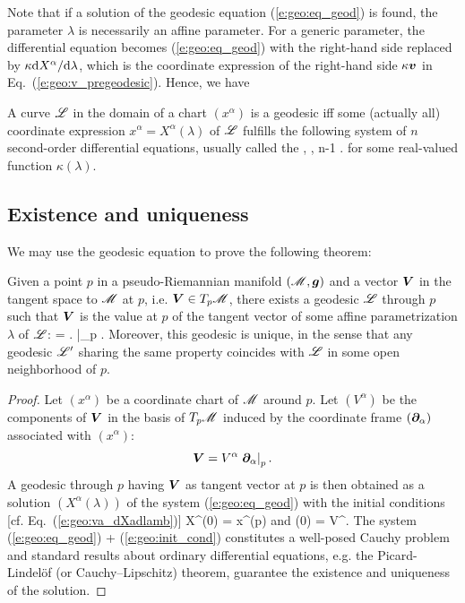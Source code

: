 Note that if a solution of the geodesic equation (\ref{e:geo:eq_geod}) is found, the parameter
$\lambda$ is necessarily an affine parameter.
For a generic parameter,
the differential equation becomes (\ref{e:geo:eq_geod}) with the right-hand side
replaced by $\kappa \mathrm{d} X^\alpha /\mathrm{d}\lambda$, which is the coordinate
expression of the right-hand side $\kappa \bm{v}$ in
Eq.~(\ref{e:geo:v_pregeodesic}). Hence, we have
\begin{prop}
A curve $\mathscr{L}$ in the domain of a chart $(x^\alpha)$ is a geodesic
iff some (actually all) coordinate expression $x^\alpha = X^\alpha(\lambda)$
of $\mathscr{L}$ fulfills the following
system of $n$ second-order differential equations, usually called the
,
\be \label{e:geo:pregeod_eq_comp}
    ,   \leq \alpha \leq n-1 .
\ee
for some real-valued function $\kappa(\lambda)$.
\end{prop}

\subsection{Existence and uniqueness} \label{s:geo:existence_uniqueness}

We may use the geodesic equation to prove the following
theorem:
\begin{prop}
\label{p:geo:exist_uniq_geod}
Given a point $p$ in a pseudo-Riemannian manifold $(\mathscr{M},\bm{g})$ and a vector
$\bm{V}$ in the tangent space to $\mathscr{M}$ at $p$, i.e. $\bm{V} \in T_p\mathscr{M}$,
there exists a geodesic $\mathscr{L}$ through $p$ such that
$\bm{V}$ is the value at $p$ of the tangent vector of some affine parametrization
$\lambda$ of $\mathscr{L}$:
\be
     = \left.  \right|_p .
\ee
Moreover, this geodesic is unique, in the sense that any geodesic $\mathscr{L}'$
sharing the same property coincides with $\mathscr{L}$
in some open neighborhood of $p$.
\end{prop}
\begin{proof}
Let $(x^\alpha)$ be a coordinate chart of $\mathscr{M}$ around $p$. Let $(V^\alpha)$
be the components of $\bm{V}$ in the basis of $T_p\mathscr{M}$ induced by
the coordinate frame $(\bm{\partial}_\alpha)$ associated with $(x^\alpha)$:
\[
    \bm{V} = V^\alpha \left. \bm{\partial}_\alpha \right| _p .
\]
A geodesic through $p$ having $\bm{V}$ as tangent vector at $p$ is then
obtained as a solution $(X^\alpha(\lambda))$ of the system (\ref{e:geo:eq_geod})
with the initial conditions [cf. Eq.~(\ref{e:geo:va_dXadlamb})]
\be \label{e:geo:init_cond}
    X^\alpha(0) = x^\alpha(p) \quad\mbox{and}\quad
    (0) = V^\alpha .
\ee
The system (\ref{e:geo:eq_geod}) + (\ref{e:geo:init_cond}) constitutes a well-posed
Cauchy problem and standard results about ordinary
differential equations, e.g. the Picard-Lindelöf (or Cauchy–Lipschitz) theorem,
guarantee the existence and uniqueness of the solution.
\end{proof}

